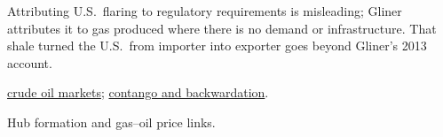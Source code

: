 \begin{qfdefinition}
 Attributing U.S.\ flaring to regulatory requirements is misleading; Gliner attributes it to gas produced where there is no demand or infrastructure. That shale turned the U.S.\ from importer into exporter goes beyond Gliner's 2013 account.

 \hyperref[def:crude-oil-markets]{crude oil markets}; \hyperref[def:contango-backwardation-stocks]{contango and backwardation}.

 Hub formation and gas--oil price links.

\end{qfdefinition}
